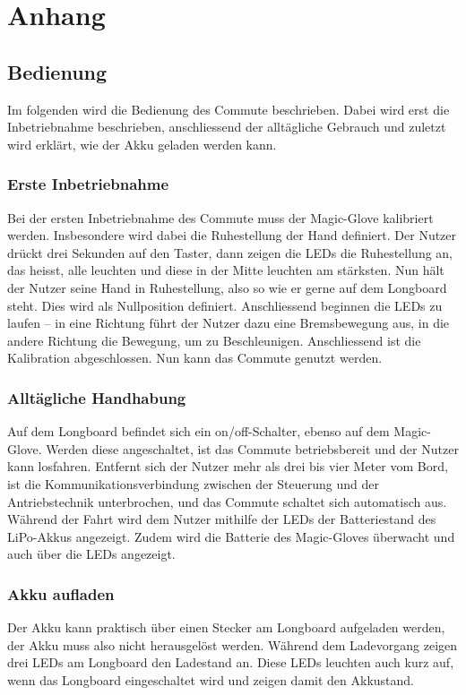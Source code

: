 \chapter{Anhang}\label{chp:Anhang}


\section{Bedienung}
Im folgenden wird die Bedienung des Commute beschrieben. Dabei wird erst die Inbetriebnahme beschrieben, anschliessend der alltägliche Gebrauch und zuletzt wird erklärt, wie der Akku geladen werden kann.
\subsection*{Erste Inbetriebnahme}
Bei der ersten Inbetriebnahme des Commute muss der Magic-Glove kalibriert werden. Insbesondere wird dabei die Ruhestellung der Hand definiert. Der Nutzer drückt drei Sekunden auf den Taster, dann zeigen die LEDs die Ruhestellung an, das heisst, alle leuchten und diese in der Mitte leuchten am stärksten. Nun hält der Nutzer seine Hand in Ruhestellung, also so wie er gerne auf dem Longboard steht. Dies wird als Nullposition definiert. Anschliessend beginnen die LEDs zu laufen – in eine Richtung führt der Nutzer dazu eine Bremsbewegung aus, in die andere Richtung die Bewegung, um zu Beschleunigen. Anschliessend ist die Kalibration abgeschlossen. Nun kann das Commute genutzt werden.
\subsection*{Alltägliche Handhabung}
Auf dem Longboard befindet sich ein on/off-Schalter, ebenso auf dem Magic-Glove. Werden diese angeschaltet, ist das Commute betriebsbereit und der Nutzer kann losfahren. 
Entfernt sich der Nutzer mehr als drei bis vier Meter vom Bord, ist die Kommunikationsverbindung zwischen der Steuerung und der Antriebstechnik unterbrochen, und das Commute schaltet sich automatisch aus. Während der Fahrt wird dem Nutzer mithilfe der LEDs der Batteriestand des LiPo-Akkus angezeigt. Zudem wird die Batterie des Magic-Gloves überwacht und auch über die LEDs angezeigt. 
\subsection*{Akku aufladen}
Der Akku kann praktisch über einen Stecker am Longboard aufgeladen werden, der Akku muss also nicht herausgelöst werden. Während dem Ladevorgang zeigen drei LEDs am Longboard den Ladestand an. Diese LEDs leuchten auch kurz auf, wenn das Longboard eingeschaltet wird und zeigen damit den Akkustand. 


